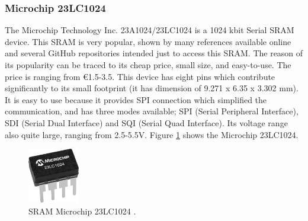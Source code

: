 \subsubsection{Microchip 23LC1024}
The Microchip Technology Inc. 23A1024/23LC1024 is a 1024 kbit Serial SRAM device. This SRAM is very popular, shown by many references available online and several GitHub repositories intended just to access this SRAM. The reason of its popularity can be traced to its cheap price, small size, and easy-to-use. The price is ranging from \euro{}1.5-3.5. This device has eight pins which contribute significantly to its small footprint (it has dimension of 9.271 x 6.35 x 3.302 mm).
It is easy to use because it provides SPI connection which simplified the communication, and has three modes available; SPI (Serial Peripheral Interface), SDI (Serial Dual Interface) and SQI (Serial Quad Interface). Its voltage range also quite large, ranging from 2.5-5.5V. Figure \ref{fig:23LC1024} shows the Microchip 23LC1024.

\begin{figure}[tph!]
    \centerline{\includegraphics[width={0.2\textwidth}]{images/23lc1024}}
    \caption{SRAM Microchip 23LC1024 \cite{23lc1024}.}
    \label{fig:23LC1024}
\end{figure}

